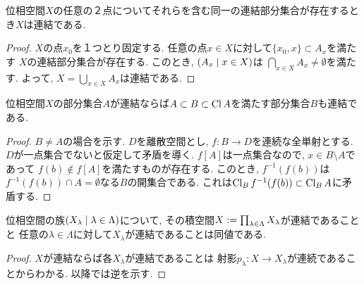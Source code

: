 \documentclass[uplatex, dvipdfmx, a4paper, 12pt, class=jsbook, crop=false]{standalone}
\begin{document}
\begin{corollary}
	位相空間$ X $の任意の２点についてそれらを含む同一の連結部分集合が存在するとき$ X $は連結である.
\end{corollary}

\begin{proof}
	$ X $の点$ x_0 $を１つとり固定する. 任意の点$ x \in X $に対して$ \{x_0, x\} \subset A_x $を満たす
	$ X $の連結部分集合が存在する. このとき, $ \setfamily{A_x}{x \in X} $は
	$ \bigcap_{x \in X} A_x \neq \emptyset$を満たす. よって, $ X = \bigcup_{x \in X} A_x $は連結である.
\end{proof}

\begin{proposition}
	\label{prop:Closure of a connected subspace is connected}
	位相空間$ X $の部分集合$ A $が連結ならば$ A \subset B \subset \mathop{\mathrm{Cl}}\nolimits A $を満たす部分集合$ B $も連結である.
\end{proposition}

\begin{proof}
	$ B \neq A $の場合を示す. $ D $を離散空間とし, $ f \colon B \to D $を連続な全単射とする.
	$ D $が一点集合でないと仮定して矛盾を導く.
	$ f[A] $は一点集合なので, $ x \in B \setminus A $であって
	$ f(b) \notin f[A] $を満たすものが存在する.
	このとき, $ f^{-1}(f(b)) $は$ f^{-1}(f(b)) \cap A = \emptyset $なる$ B $の開集合である.
	これは$ \mathop{\mathrm{Cl}}\nolimits_B f^{-1}(f(b)) \subset \mathop{\mathrm{Cl}}\nolimits_B A $に矛盾する.
\end{proof}

\begin{proposition}
	\label{prop:A product space of connected spaces is connected}
	位相空間の族$ \setfamily{X_\lambda}{\lambda \in \Lambda} $について,
	その積空間$ X \mathrel{:=} \prod_{\lambda \in \Lambda} X_\lambda $が連結であることと
	任意の$ \lambda \in \Lambda $に対して$ X_\lambda $が連結であることは同値である.
\end{proposition}

\begin{proof}
	$ X $が連結ならば各$ X_\lambda $が連結であることは
	射影$ p_\lambda \colon X \to X_\lambda $が連続であることからわかる.
	以降では逆を示す.
	\WIP
\end{proof}
\end{document}
